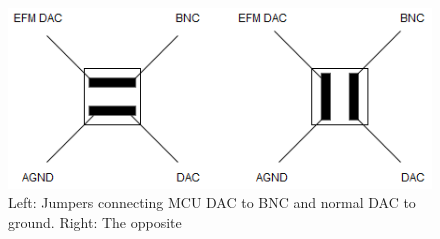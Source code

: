\begin{figure}[h!]
\centering
\includegraphics[scale = 0.6]{images/DAC_headers.png}
\caption{Left: Jumpers connecting MCU DAC to BNC and normal DAC to ground.
         Right: The opposite}
\label{fig:DAC headers}
\end{figure}

